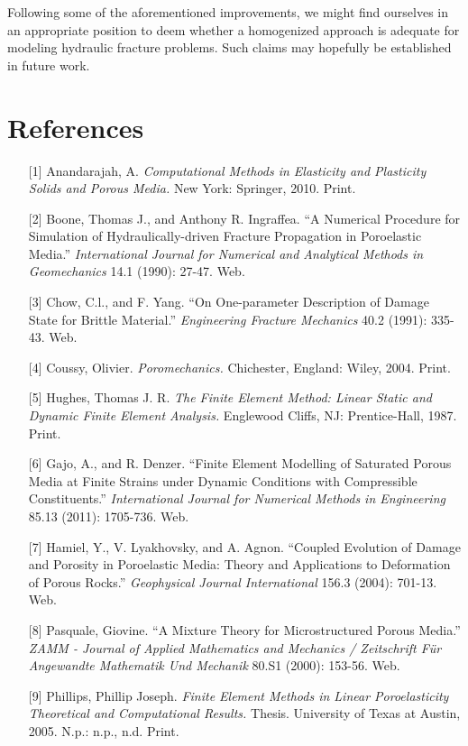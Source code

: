 \documentclass[11pt]{article} %
\begin{document}
Following some of the aforementioned improvements, we might find ourselves in an appropriate position to deem whether a homogenized approach is adequate for modeling hydraulic fracture problems. Such claims may hopefully be established in future work.

\newpage

\section{References}
\begin{itemize}
	\item[{[1]}] Anandarajah, A. \textit{Computational Methods in Elasticity and Plasticity Solids and Porous Media.} New York: Springer, 2010. Print.
	\item[{[2]}] Boone, Thomas J., and Anthony R. Ingraffea. ``A Numerical Procedure for Simulation of Hydraulically-driven Fracture Propagation in Poroelastic Media.'' \textit{International Journal for Numerical and Analytical Methods in Geomechanics} 14.1 (1990): 27-47. Web.
	\item[{[3]}] Chow, C.l., and F. Yang. ``On One-parameter Description of Damage State for Brittle Material.'' \textit{Engineering Fracture Mechanics} 40.2 (1991): 335-43. Web.
	\item[{[4]}] Coussy, Olivier. \textit{Poromechanics.} Chichester, England: Wiley, 2004. Print.
	\item[{[5]}] Hughes, Thomas J. R. \textit{The Finite Element Method: Linear Static and Dynamic Finite Element Analysis.} Englewood Cliffs, NJ: Prentice-Hall, 1987. Print.
	\item[{[6]}] Gajo, A., and R. Denzer. ``Finite Element Modelling of Saturated Porous Media at Finite Strains under Dynamic Conditions with Compressible Constituents.'' \textit{International Journal for Numerical Methods in Engineering} 85.13 (2011): 1705-736. Web.
	\item[{[7]}] Hamiel, Y., V. Lyakhovsky, and A. Agnon. ``Coupled Evolution of Damage and Porosity in Poroelastic Media: Theory and Applications to Deformation of Porous Rocks.'' \textit{Geophysical Journal International} 156.3 (2004): 701-13. Web.
	\item[{[8]}] Pasquale, Giovine. ``A Mixture Theory for Microstructured Porous Media.'' \textit{ZAMM - Journal of Applied Mathematics and Mechanics / Zeitschrift Für Angewandte Mathematik Und Mechanik} 80.S1 (2000): 153-56. Web.
	\item[{[9]}] Phillips, Phillip Joseph. \textit{Finite Element Methods in Linear Poroelasticity Theoretical and Computational Results.} Thesis. University of Texas at Austin, 2005. N.p.: n.p., n.d. Print.

\end{itemize}
\end{document}
